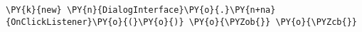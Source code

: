 \begin{Verbatim}[commandchars=\\\{\}]
\PY{k}{new} \PY{n}{DialogInterface}\PY{o}{.}\PY{n+na}{OnClickListener}\PY{o}{(}\PY{o}{)} \PY{o}{\PYZob{}} \PY{o}{\PYZcb{}}
\end{Verbatim}
